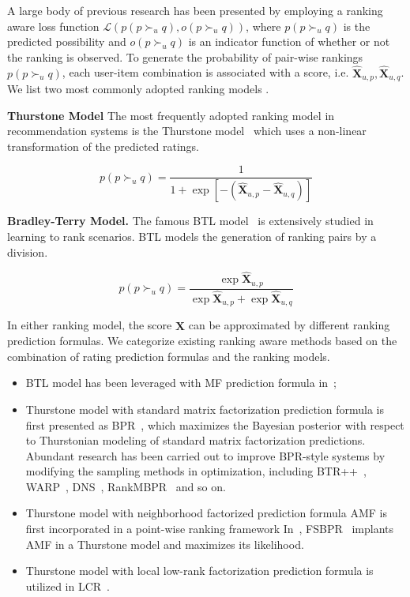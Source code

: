 \documentclass[letterpaper]{article} %
\newcommand{\Rating}{\mathbf{X}}
\newcommand{\Loss}{\mathcal{L}}
\begin{document}
A large body of previous research has been presented by employing a ranking aware loss function  $\Loss(p(p\succ_u q), o(p\succ_u q))$, where $p(p\succ_u q)$ is the predicted possibility and $o(p\succ_u q)$ is an indicator function of whether or not the ranking is observed. To generate the probability of pair-wise rankings $p(p\succ_u q)$,  each user-item combination is associated with a score, i.e. $\hat{\Rating}_{u,p},\hat{\Rating}_{u,q}$.  We list two most commonly adopted ranking models . 


\textbf{Thurstone Model} The most frequently adopted ranking model in recommendation systems is the Thurstone model~\cite{Thurstone1927law} which uses a non-linear transformation of the predicted ratings. 

\begin{equation}
p(p\succ_u q) = \frac{1} {1+\exp[-(\hat{\Rating}_{u,p}-\hat{\Rating}_{u,q})]}
\end{equation}

\textbf{Bradley-Terry Model.} The famous BTL model~\cite{Hunter2004MM} is extensively studied in learning to rank scenarios. BTL models the generation of ranking pairs by a division.

\begin{equation}\label{equ:BTL}
p(p\succ_u q) = \frac{\exp{\hat{\Rating}_{u,p}}}{\exp{\hat{\Rating}_{u,p}}+ \exp{\hat{\Rating}_{u,q}}} 
\end{equation}


In either ranking model, the score $\hat{\Rating}$ can be approximated by different ranking prediction formulas. We categorize existing ranking aware methods based on the combination of rating prediction formulas and the ranking models. 
\begin{itemize}
\item BTL model has been leveraged with MF prediction formula in~\cite{Hu2016Improved};
\item Thurstone model with standard matrix factorization prediction formula is first presented as BPR~\cite{Rendle2009BPR}, which maximizes the Bayesian posterior with respect to Thurstonian modeling of standard matrix factorization predictions. Abundant research has been carried out to improve BPR-style systems by modifying the sampling methods in optimization, including BTR++~\cite{Lerche2014Using}, WARP~\cite{Weston2011Wsabie}, DNS~\cite{Zhang2013Optimizing}, RankMBPR~\cite{Yu2016RankMBPR} and so on.
\item Thurstone model with  neighborhood factorized prediction formula AMF is first incorporated in a point-wise ranking framework In~\cite{Steck2015Gaussian},  FSBPR~\cite{Zhao2018Factored} implants AMF in a Thurstone model and maximizes its likelihood.
\item Thurstone model with local low-rank factorization prediction formula is utilized in LCR~\cite{Lee2014Local}.
 \end{itemize}
\end{document}
